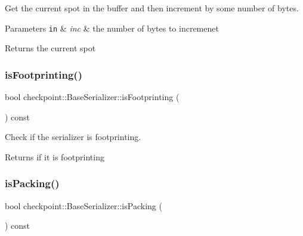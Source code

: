 Get the current spot in the buffer and then increment by some number of bytes. 


\begin{DoxyParams}[1]{Parameters}
\mbox{\tt in}  & {\em inc} & the number of bytes to incremenet\\
\hline
\end{DoxyParams}
\begin{DoxyReturn}{Returns}
the current spot 
\end{DoxyReturn}
\mbox{\label{structcheckpoint_1_1_base_serializer_a76960f01f04457bca6a40d91d2c4b486}} 
\subsubsection{\texorpdfstring{is\+Footprinting()}{isFootprinting()}}
{\footnotesize\ttfamily bool checkpoint\+::\+Base\+Serializer\+::is\+Footprinting (\begin{DoxyParamCaption}{ }\end{DoxyParamCaption}) const\hspace{0.3cm}{\ttfamily [inline]}}



Check if the serializer is footprinting. 

\begin{DoxyReturn}{Returns}
if it is footprinting 
\end{DoxyReturn}
\mbox{\label{structcheckpoint_1_1_base_serializer_a1a91b7c0fc85cbd31356791bbf288b0e}} 
\subsubsection{\texorpdfstring{is\+Packing()}{isPacking()}}
{\footnotesize\ttfamily bool checkpoint\+::\+Base\+Serializer\+::is\+Packing (\begin{DoxyParamCaption}{ }\end{DoxyParamCaption}) const\hspace{0.3cm}{\ttfamily [inline]}}



